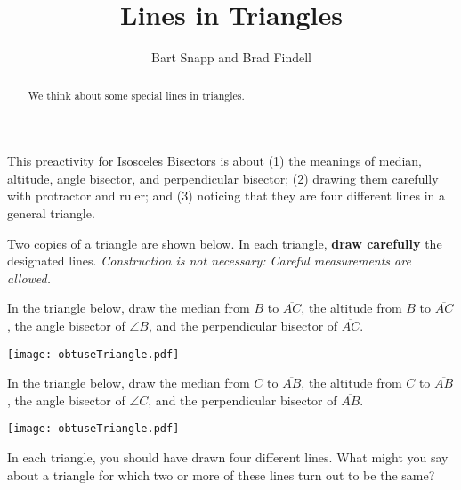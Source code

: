 \documentclass[nooutcomes]{ximera}
\title{Lines in Triangles}
\author{Bart Snapp and Brad Findell}
\begin{document}
\begin{abstract}
  We think about some special lines in triangles. 
\end{abstract}
\maketitle

\begin{teachingnote}
This preactivity for Isosceles Bisectors is about (1) the meanings of median, altitude, angle bisector, and perpendicular bisector; (2) drawing them carefully with protractor and ruler; and (3) noticing that they are four different lines in a general triangle. 
\end{teachingnote}

Two copies of a triangle are shown below.   In each triangle, \textbf{draw carefully} the designated lines.  \emph{Construction is not necessary:  Careful measurements are allowed.}

\begin{problem}
In the triangle below, draw the median from $B$ to $\overline{AC}$, the altitude from $B$ to $\overline{AC}$, the angle bisector of $\angle B$, and the perpendicular bisector 
of $\overline{AC}$.  

\texttt{[image: obtuseTriangle.pdf]}
\vfill
\end{problem}

\newpage
\begin{problem}
In the triangle below, draw the median from $C$ to $\overline{AB}$, the altitude from $C$ to $\overline{AB}$, the angle bisector of $\angle C$, and the perpendicular bisector of $\overline{AB}$. 

%
\texttt{[image: obtuseTriangle.pdf]}
\end{problem}


\begin{problem}
In each triangle, you should have drawn four different lines.  What might you say about a triangle for which two or more of these lines turn out to be the same?  
\vfill
\end{problem}
\end{document}
